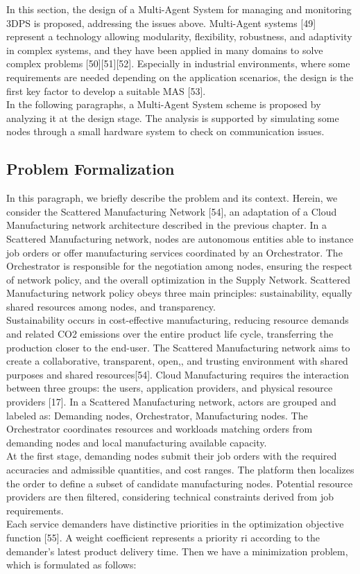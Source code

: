 In this section, the design of a Multi-Agent System for managing and monitoring 3DPS is proposed, addressing the issues above. Multi-Agent systems [49] represent a technology allowing modularity, flexibility, robustness, and adaptivity in complex systems, and they have been applied in many domains to solve complex problems [50][51][52]. Especially in industrial environments, where some requirements are needed depending on the application scenarios, the design is the first key factor to develop a suitable MAS [53].\\
In the following paragraphs, a Multi-Agent System scheme is proposed by analyzing it at the design stage. The analysis is supported by simulating some nodes through a small hardware system to check on communication issues.
\subsection{Problem Formalization}
In this paragraph, we briefly describe the problem and its context. Herein, we consider the Scattered Manufacturing Network [54], an adaptation of a Cloud Manufacturing network architecture described in the previous chapter. In a Scattered Manufacturing network, nodes are autonomous entities able to instance job orders or offer manufacturing services coordinated by an Orchestrator. The Orchestrator is responsible for the negotiation among nodes, ensuring the respect of network policy, and the overall optimization in the Supply Network. Scattered Manufacturing network policy obeys three main principles: sustainability, equally shared resources among nodes, and transparency.\\
Sustainability occurs in cost-effective manufacturing, reducing resource demands and related CO2 emissions over the entire product life cycle, transferring the production closer to the end-user. The Scattered Manufacturing network aims to create a collaborative, transparent, open,, and trusting environment with shared purposes and shared resources[54]. Cloud Manufacturing requires the interaction between three groups: the users, application providers, and physical resource providers [17]. In a Scattered Manufacturing network, actors are grouped and labeled as: Demanding nodes, Orchestrator, Manufacturing nodes. The Orchestrator coordinates resources and workloads matching orders from demanding nodes and local manufacturing available capacity.\\
At the first stage, demanding nodes submit their job orders with the required accuracies and admissible quantities, and cost ranges. The platform then localizes the order to define a subset of candidate manufacturing nodes. Potential resource providers are then filtered, considering technical constraints derived from job requirements.\\
Each service demanders have distinctive priorities in the optimization objective function [55]. A weight coefficient represents a priority ri according to the demander’s latest product delivery time. Then we have a minimization problem, which is formulated as follows:\\

